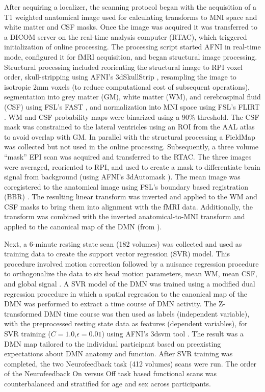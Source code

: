 After acquiring a localizer, the scanning protocol began with the acquisition of a T1 weighted anatomical image used for calculating transforms to MNI space and white matter and CSF masks. Once the image was acquired it was transferred to a DICOM server on the real-time analysis computer (RTAC), which triggered initialization of online processing. The processing script started AFNI in real-time mode, configured it for fMRI acquisition, and began structural image processing. Structural processing included reorienting the structural image to RPI voxel order, skull-stripping using AFNI's 3dSkullStrip \cite{Cox_1996}, resampling the image to isotropic 2mm voxels (to reduce computational cost of subsequent operations), segmentation into grey matter (GM), white matter (WM), and cerebrospinal fluid (CSF) using FSL's FAST \cite{Zhang2001}, and normalization into MNI space using FSL's FLIRT \cite{Jenkinson_2001,Jenkinson_2002}. WM and CSF probability maps were binarized using a 90\% threshold. The CSF mask was constrained to the lateral ventricles using an ROI from the AAL atlas to avoid overlap with GM.
In parallel with the structural processing a FieldMap was collected but not used in the online processing. Subsequently, a three volume ``mask'' EPI scan was acquired and transferred to the RTAC. The three images were averaged, reoriented to RPI, and used to create a mask to differentiate brain signal from background (using AFNI's 3dAutomask \cite{Cox_1996}). The mean image was coregistered to the anatomical image using FSL's boundary based registration (BBR) \cite{Greve2009}. The resulting linear transform was inverted and applied to the WM and CSF masks to bring them into alignment with the fMRI data. Additionally, the transform was combined with the inverted anatomical-to-MNI transform and applied to the canonical map of the DMN (from \cite{Smith2009a}).

Next, a 6-minute resting state scan (182 volumes) was collected and used as training data to create the support vector regression (SVR) model. This procedure involved motion correction followed by a nuisance regression procedure to orthogonalize the data to six head motion parameters, mean WM, mean CSF, and global signal \cite{Fox_2005,Friston1996,Lund_2006}. A SVR model of the DMN was trained using a modified dual regression procedure in which a spatial regression to the canonical map of the DMN was performed to extract a time course of DMN activity. The Z-transformed DMN time course was then used as labels (independent variable), with the preprocessed resting state data as features (dependent variables), for SVR training ($C=1.0$,$ \epsilon = 0.01$) using AFNI's 3dsvm tool \cite{Laconte_2005}. The result was a DMN map tailored to the individual participant based on preexisting expectations about DMN anatomy and function. After SVR training was completed, the two Neurofeedback task (412 volumes) scans were run.  The order of the Neurofeedback On versus Off task based functional scans was counterbalanced and stratified for age and sex across participants.

